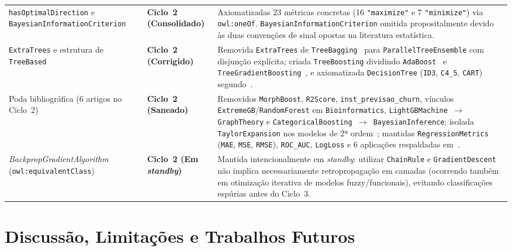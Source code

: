 \documentclass[11pt,a4paper]{article}
\newcommand{\onto}[1]{\texttt{#1}}
\begin{document}
\begin{table}[htbp]
\begin{tabularx}{\textwidth}{@{}p{2.9cm}p{2.6cm}>{\raggedright\arraybackslash}X@{}}
\addlinespace[3pt]
\onto{hasOptimalDirection} e \onto{BayesianInformationCriterion} & \textbf{Ciclo~2 (Consolidado)} & Axiomatizadas 23 métricas concretas (16 \onto{"maximize"} e 7 \onto{"minimize"}) via \onto{owl:oneOf}. \onto{BayesianInformationCriterion} omitida propositalmente devido às duas convenções de sinal opostas na literatura estatística. \\
\addlinespace[3pt]
\onto{ExtraTrees} e estrutura de \onto{TreeBased} & \textbf{Ciclo~2 (Corrigido)} & Removida \onto{ExtraTrees} de \onto{TreeBagging}~\cite{geurts2006extremely} para \onto{ParallelTreeEnsemble} com disjunção explícita; criada \onto{TreeBoosting} dividindo \onto{AdaBoost}~\cite{freund1997decision} e \onto{TreeGradientBoosting}~\cite{bentejac2021comparative}, e axiomatizada \onto{DecisionTree} (\onto{ID3}, \onto{C4\_5}, \onto{CART}) segundo~\cite{breiman1984cart,quinlan1993c45,sarker2021ml}. \\
\addlinespace[3pt]
Poda bibliográfica (6 artigos no Ciclo~2) & \textbf{Ciclo~2 (Saneado)} & Removidos \onto{MorphBoost}, \onto{R2Score}, \onto{inst\_previsao\_churn}, vínculos \onto{ExtremeGB}/\onto{RandomForest} em \onto{Bioinformatics}, \onto{LightGBMachine $\rightarrow$ GraphTheory} e \onto{CategoricalBoosting $\rightarrow$ BayesianInference}; isolada \onto{TaylorExpansion} nos modelos de 2ª ordem~\cite{bentejac2021comparative}; mantidas \onto{RegressionMetrics} (\onto{MAE}, \onto{MSE}, \onto{RMSE}), \onto{ROC\_AUC}, \onto{LogLoss} e 6 aplicações respaldadas em~\cite{breiman1984cart,breiman2001random,geurts2006extremely,bentejac2021comparative,sarker2021ml,elmassari2022diabetes}. \\
\addlinespace[3pt]
\emph{BackpropGradientAlgorithm} (\onto{owl:equivalentClass}) & \textbf{Ciclo~2 (Em \emph{standby})} & Mantida intencionalmente em \emph{standby}: utilizar \onto{ChainRule} e \onto{GradientDescent} não implica necessariamente retropropagação em camadas (ocorrendo também em otimização iterativa de modelos fuzzy/funcionais), evitando classificações espúrias antes do Ciclo~3. \\
\bottomrule
\end{tabularx}
\end{table}

\section{Discussão, Limitações e Trabalhos Futuros}\label{sec:disc}
\end{document}
